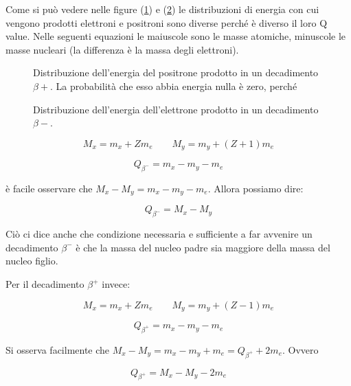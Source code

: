  Come si può vedere nelle figure (\ref{qbetapiu}) e (\ref{qbetameno}) le distribuzioni di energia con cui vengono prodotti elettroni e positroni sono diverse perché è diverso il loro Q value. Nelle seguenti equazioni le maiuscole sono le masse atomiche, minuscole le masse nucleari (la differenza è la massa degli elettroni).

\begin{figure}
\centering
		\caption{Distribuzione dell'energia del positrone prodotto in un decadimento $\beta+$. La probabilità che esso abbia energia nulla è zero, perché}
         \label{qbetapiu}
\end{figure}

\begin{figure}
\centering
		\caption{Distribuzione dell'energia dell'elettrone prodotto in un decadimento $\beta-$.}
         \label{qbetameno}
\end{figure}

\begin{equation}
M_x=m_x+Zm_e 	\qquad M_y=m_y+(Z+1)m_e
\end{equation}

\begin{equation}
Q_{\beta^-}=m_x-m_y-m_e
\end{equation}

è facile osservare che $M_x-M_y=m_x-m_y-m_e$. Allora possiamo dire:

\begin{equation}
Q_{\beta^-}=M_x-M_y
\end{equation}

Ciò ci dice anche che condizione necessaria e sufficiente a far avvenire un decadimento $\beta^-$ è che la massa del nucleo padre sia maggiore della massa del nucleo figlio.

Per il decadimento $\beta^+$ invece:

\begin{equation}
M_x=m_x+Zm_e \qquad M_y=m_y+(Z-1)m_e
\end{equation}

\begin{equation}
Q_{\beta^+}=m_x-m_y-m_e
\end{equation}

Si osserva facilmente che $M_x-M_y=m_x-m_y+m_e=Q_{\beta^+}+2m_e$.
Ovvero

\begin{equation}
Q_{\beta^+}=M_x-M_y-2m_e
\end{equation}


